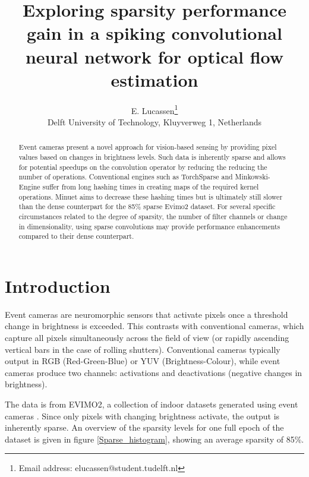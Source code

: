 \documentclass{article}
\title{Exploring sparsity performance gain in a spiking convolutional neural network for optical flow estimation}
\author{E. Lucassen\thanks{Email address: elucassen@student.tudelft.nl} \\ Delft University of Technology, Kluyverweg 1, Netherlands}
\begin{document}
\maketitle
\begin{abstract}
	Event cameras present a novel approach for vision-based sensing by providing pixel values based on changes in brightness levels. Such data is inherently sparse and allows for potential speedups on the convolution operator by reducing the reducing the number of operations. Conventional engines such as TorchSparse \cite{tang2023torchsparse++} and Minkowski-Engine \cite{choy20194d-MinkowskiEngine} suffer from long hashing times in creating maps of the required kernel operations. Minuet \cite{yang2023minuet} aims to decrease these hashing times but is ultimately still slower than the dense counterpart for the 85\% sparse Evimo2 dataset. For several specific circumstances related to the degree of sparsity, the number of filter channels or change in dimensionality, using sparse convolutions may provide performance enhancements compared to their dense counterpart. 
	\end{abstract}


\section{Introduction}
\label{Background}

Event cameras are neuromorphic sensors that activate pixels once a threshold change in brightness is exceeded. This contrasts with conventional cameras, which capture all pixels simultaneously across the field of view (or rapidly ascending vertical bars in the case of rolling shutters). Conventional cameras typically output in RGB (Red-Green-Blue) or YUV (Brightness-Colour), while event cameras produce two channels: activations and deactivations (negative changes in brightness).

The data is from EVIMO2, a collection of indoor datasets generated using event cameras \cite{EVIMO2}. Since only pixels with changing brightness activate, the output is inherently sparse. An overview of the sparsity levels for one full epoch of the dataset is given in figure \ref{Sparse_histogram}, showing an average sparsity of 85\%.
\end{document}
